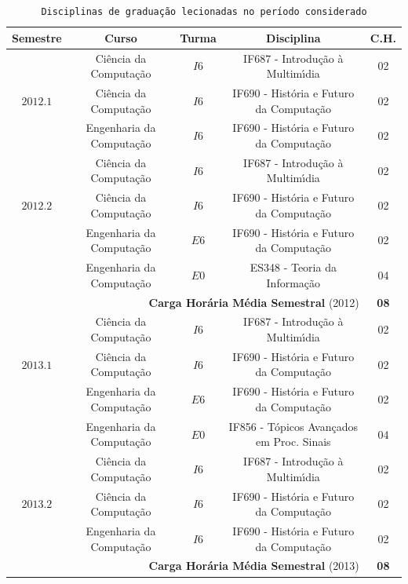 \documentclass[a4paper,oneside,10pt]{article}
\newcommand{\otoprule}{\midrule[\heavyrulewidth]}
\begin{document}
\begin{table}[!htpb]
\centering \small
\caption{\texttt{Disciplinas de gradua\c{c}\~{a}o lecionadas no per\'{\i}odo considerado} }
\begin{tabular}{ccccc}
\toprule
\textbf{Semestre} & \textbf{Curso} & \textbf{Turma} & \textbf{Disciplina} & \textbf{C.H.} \\
\otoprule
  & Ci\^{e}ncia da Computa\c{c}\~{a}o & $I6$ & IF687 - Introdu\c{c}\~{a}o \`{a} Multim\'{\i}dia & 02\\
$2012.1$ & Ci\^{e}ncia da Computa\c{c}\~{a}o & $I6$ & IF690 - Hist\'{o}ria e Futuro da Computa\c{c}\~{a}o & 02\\
  & Engenharia da Computa\c{c}\~{a}o & $I6$ & IF690 - Hist\'{o}ria e Futuro da Computa\c{c}\~{a}o & 02\\
\cmidrule{1-5}
  & Ci\^{e}ncia da Computa\c{c}\~{a}o & $I6$ & IF687 - Introdu\c{c}\~{a}o \`{a} Multim\'{\i}dia & 02\\
$2012.2$ & Ci\^{e}ncia da Computa\c{c}\~{a}o & $I6$ & IF690 - Hist\'{o}ria e Futuro da Computa\c{c}\~{a}o & 02\\
  & Engenharia da Computa\c{c}\~{a}o & $E6$ & IF690 - Hist\'{o}ria e Futuro da Computa\c{c}\~{a}o & 02\\
  & Engenharia da Computa\c{c}\~{a}o & $E0$ & ES348 - Teoria da Informa\c{c}\~{a}o & 04\\
\cmidrule{1-5}
\multicolumn{4}{r}{\textbf{Carga Hor\'{a}ria M\'{e}dia Semestral} (2012)} & \textbf{08} \\
\otoprule
& Ci\^{e}ncia da Computa\c{c}\~{a}o & $I6$ & IF687 - Introdu\c{c}\~{a}o \`{a} Multim\'{\i}dia & 02\\
$2013.1$ & Ci\^{e}ncia da Computa\c{c}\~{a}o & $I6$ & IF690 - Hist\'{o}ria e Futuro da Computa\c{c}\~{a}o & 02\\
  & Engenharia da Computa\c{c}\~{a}o & $E6$ & IF690 - Hist\'{o}ria e Futuro da Computa\c{c}\~{a}o & 02\\
  & Engenharia da Computa\c{c}\~{a}o & $E0$ & IF856 - T\'{o}picos Avan\c{c}ados em Proc. Sinais & 04\\
\cmidrule{1-5}
& Ci\^{e}ncia da Computa\c{c}\~{a}o & $I6$ & IF687 - Introdu\c{c}\~{a}o \`{a} Multim\'{\i}dia & 02\\
$2013.2$ & Ci\^{e}ncia da Computa\c{c}\~{a}o & $I6$ & IF690 - Hist\'{o}ria e Futuro da Computa\c{c}\~{a}o & 02\\
  & Engenharia da Computa\c{c}\~{a}o & $I6$ & IF690 - Hist\'{o}ria e Futuro da Computa\c{c}\~{a}o & 02\\
\cmidrule{1-5}
\multicolumn{4}{r}{\textbf{Carga Hor\'{a}ria M\'{e}dia Semestral} (2013)} & \textbf{08} \\
\bottomrule
\end{tabular}
\label{Tab:Disc_Grad}
\end{table}
\end{document}
